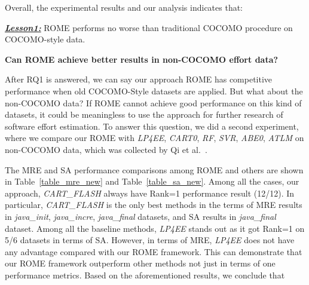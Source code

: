 \documentclass[sigconf,review,anonymous]{acmart}
\newenvironment{result}[2]
{\begin{myshadowbox}\textbf{\textit{\underline{Lesson#1:}}} #2}{ 
\end{myshadowbox}}
\begin{document}
Overall, the experimental results and our analysis indicates that:
 
 \begin{result}{1}
ROME performs no worse than traditional COCOMO procedure on COCOMO-style data.
 \end{result}

{\bf Can ROME achieve better results in non-COCOMO effort data?}

After RQ1 is answered, we can say our approach ROME has competitive performance when old COCOMO-Style datasets are applied. But what about the non-COCOMO data? If ROME cannot achieve good performance on this kind of datasets, it could be meaningless to use the approach for further research of software effort estimation. To answer this question, we did a second experiment, where we compare our ROME with {\it LP4EE}, {\it CART0}, {\it RF}, {\it SVR}, {\it ABE0}, {\it ATLM} on non-COCOMO data, which was collected by Qi et al.~\cite{qi2017software}.



The MRE and SA performance comparisons among ROME and others are shown in  Table~\ref{table_mre_new} and Table~\ref{table_sa_new}. Among all the cases, our approach, {\it CART\_FLASH} always have Rank=1 performance result (12/12). In particular, {\it CART\_FLASH} is the only best methods in the terms of MRE results in {\it java\_init}, {\it java\_incre}, {\it java\_final} datasets, and SA results in {\it java\_final} dataset. Among all the baseline methods, {\it LP4EE} stands out as it got Rank=1 on 5/6 datasets in terms of SA. However, in terms of MRE, {\it LP4EE} does not have any advantage compared with our ROME framework. This can demonstrate that our ROME framework outperform other methods not just in terms of one performance metrics. 
Based on the aforementioned results, we conclude that
\end{document}
